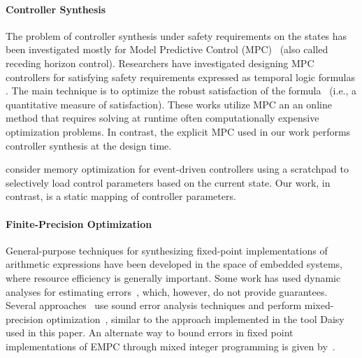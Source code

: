 \paragraph{Controller Synthesis}
The problem of controller synthesis under safety requirements on the states has
been investigated mostly for Model Predictive Control (MPC)~\cite{camacho2013model} (also called receding horizon control).
Researchers have investigated designing MPC controllers for satisfying safety requirements expressed as temporal logic formulas 
\cite{FMPS18,KaramanSF08,raman2014model,WongpiromsarnTM12,pant2017smooth,kim2017dynamic}.
The main technique is to optimize the robust satisfaction of 
the formula~\cite{donze2010robust} (i.e., a quantitative measure of satisfaction).
These works utilize MPC an an online method that requires solving at runtime often computationally 
expensive optimization problems. In contrast, the explicit MPC used in our work performs controller synthesis at the design time.

\citet{SahaM12} consider memory optimization for event-driven controllers
using a scratchpad to selectively load control parameters based on the current state.
Our work, in contrast, is a static mapping of controller parameters.


\paragraph{Finite-Precision Optimization}
General-purpose techniques for synthesizing fixed-point implementations of 
arithmetic expressions have been developed in the space of embedded systems,
where resource efficiency is generally important.
Some work has used dynamic analyses for estimating
errors~\cite{Gaffar2004,Mallik2007}, which, however, do not provide guarantees.
Several approaches~\cite{Lee2006,Osborne2007,Kinsman2009,Pang2011} use sound
error analysis techniques and perform mixed-precision optimization~\cite{Lee2006,Pang2011},
similar to the approach implemented in the tool Daisy used in this paper.
An alternate way to bound errors in fixed point implementations of EMPC 
through mixed integer programming is given by~\citet{imperialrmpc}. 

